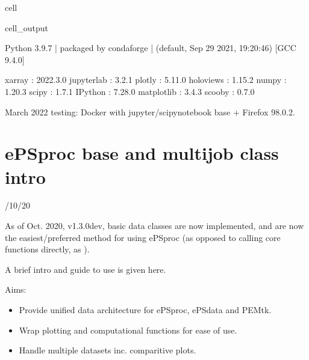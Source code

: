 \documentclass[letterpaper,10pt,english]{jupyterBook}
\begin{document}
\begin{sphinxuseclass}{cell}
\begin{sphinxVerbatimOutput}
\begin{sphinxuseclass}{cell_output}
\begin{sphinxVerbatim}[commandchars=\\\{\}]
  Python 3.9.7 | packaged by conda\PYGZhy{}forge | (default, Sep 29 2021, 19:20:46)
  [GCC 9.4.0]

            xarray : 2022.3.0
        jupyterlab : 3.2.1
            plotly : 5.11.0
         holoviews : 1.15.2
             numpy : 1.20.3
             scipy : 1.7.1
           IPython : 7.28.0
        matplotlib : 3.4.3
            scooby : 0.7.0
\PYGZhy{}\PYGZhy{}\PYGZhy{}\PYGZhy{}\PYGZhy{}\PYGZhy{}\PYGZhy{}\PYGZhy{}\PYGZhy{}\PYGZhy{}\PYGZhy{}\PYGZhy{}\PYGZhy{}\PYGZhy{}\PYGZhy{}\PYGZhy{}\PYGZhy{}\PYGZhy{}\PYGZhy{}\PYGZhy{}\PYGZhy{}\PYGZhy{}\PYGZhy{}\PYGZhy{}\PYGZhy{}\PYGZhy{}\PYGZhy{}\PYGZhy{}\PYGZhy{}\PYGZhy{}\PYGZhy{}\PYGZhy{}\PYGZhy{}\PYGZhy{}\PYGZhy{}\PYGZhy{}\PYGZhy{}\PYGZhy{}\PYGZhy{}\PYGZhy{}\PYGZhy{}\PYGZhy{}\PYGZhy{}\PYGZhy{}\PYGZhy{}\PYGZhy{}\PYGZhy{}\PYGZhy{}\PYGZhy{}\PYGZhy{}\PYGZhy{}\PYGZhy{}\PYGZhy{}\PYGZhy{}\PYGZhy{}\PYGZhy{}\PYGZhy{}\PYGZhy{}\PYGZhy{}\PYGZhy{}\PYGZhy{}\PYGZhy{}\PYGZhy{}\PYGZhy{}\PYGZhy{}\PYGZhy{}\PYGZhy{}\PYGZhy{}\PYGZhy{}\PYGZhy{}\PYGZhy{}\PYGZhy{}\PYGZhy{}\PYGZhy{}\PYGZhy{}\PYGZhy{}\PYGZhy{}\PYGZhy{}\PYGZhy{}\PYGZhy{}
\end{sphinxVerbatim}

\end{sphinxuseclass}\end{sphinxVerbatimOutput}

\end{sphinxuseclass}
\sphinxAtStartPar
March 2022 testing: Docker with jupyter/scipy\sphinxhyphen{}notebook base + Firefox 98.0.2.

\sphinxstepscope


\chapter{ePSproc base and multijob class intro}
\label{\detokenize{testChpt/ePSproc_class_demo_161020:epsproc-base-and-multijob-class-intro}}\label{\detokenize{testChpt/ePSproc_class_demo_161020::doc}}
/10/20

\sphinxAtStartPar
As of Oct. 2020, v1.3.0\sphinxhyphen{}dev, basic data classes are now implemented, and are now the easiest/preferred method for using ePSproc (as opposed to calling core functions directly, as ).

\sphinxAtStartPar
A brief intro and guide to use is given here.

\sphinxAtStartPar
Aims:
\begin{itemize}
\item {} 
\sphinxAtStartPar
Provide unified data architecture for ePSproc, ePSdata and PEMtk.

\item {} 
\sphinxAtStartPar
Wrap plotting and computational functions for ease of use.

\item {} 
\sphinxAtStartPar
Handle multiple datasets inc. comparitive plots.

\end{itemize}
\end{document}

